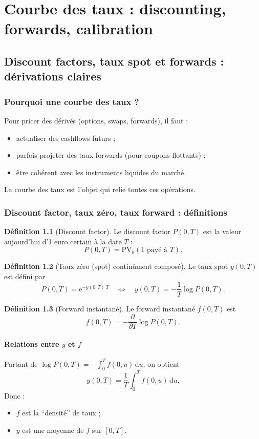 \documentclass[11pt,a4paper]{report}
\newcommand{\dd}{\mathrm{d}}
\newcommand{\ee}{\mathrm{e}}
\newcommand{\1}{\mathbbm{1}}
\newcommand{\pd}[2]{\frac{\partial #1}{\partial #2}}
\theoremstyle{definition}
\newtheorem{definition}{Définition}[chapter]
\theoremstyle{plain}
\theoremstyle{remark}
\begin{document}
\part{Courbe des taux : discounting, forwards, calibration}

\chapter{Discount factors, taux spot et forwards : dérivations claires}
\label{chap:yield_basics}

\section{Pourquoi une courbe des taux ?}
Pour pricer des dérivés (options, swaps, forwards), il faut :
\begin{itemize}
  \item actualiser des cashflows futurs ;
  \item parfois projeter des taux forwards (pour coupons flottants) ;
  \item être cohérent avec les instruments liquides du marché.
\end{itemize}
La courbe des taux est l'objet qui relie toutes ces opérations.

\section{Discount factor, taux zéro, taux forward : définitions}
\begin{definition}[Discount factor]
Le discount factor $P(0,T)$ est la valeur aujourd'hui d'1 euro certain à la date $T$ :
\[
P(0,T)=\text{PV}_0(1 \text{ payé à } T).
\]
\end{definition}

\begin{definition}[Taux zéro (spot) continûment composé]
Le taux spot $y(0,T)$ est défini par
\[
P(0,T)=\ee^{-y(0,T)\,T}
\quad\Longleftrightarrow\quad
y(0,T) = -\frac{1}{T}\log P(0,T).
\]
\end{definition}

\begin{definition}[Forward instantané]
Le forward instantané $f(0,T)$ est
\[
f(0,T) = -\pd{}{T}\log P(0,T).
\]
\end{definition}

\subsection{Relations entre $y$ et $f$}
Partant de $\log P(0,T)=-\int_0^T f(0,u)\,\dd u$, on obtient
\[
y(0,T) = \frac{1}{T}\int_0^T f(0,u)\,\dd u.
\]
Donc :
\begin{itemize}
  \item $f$ est la ``densité'' de taux ;
  \item $y$ est une moyenne de $f$ sur $[0,T]$.
\end{itemize}
\end{document}
